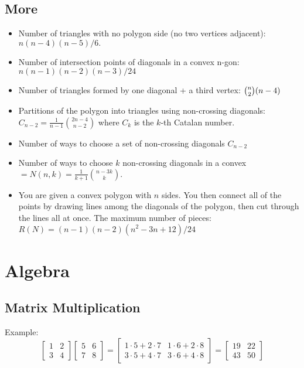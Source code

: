 \documentclass[11pt,a4paper]{article}
\begin{document}
\begin{multicols*}{2}
\subsection{More}
\begin{itemize}
    \item Number of triangles with no polygon side (no two vertices adjacent): $n( n - 4 )( n - 5 ) / 6.$
    \item Number of intersection points of diagonals in a convex n-gon: $n(n-1)(n-2)(n-3) / 24$
    \item Number of triangles formed by one diagonal + a third vertex: $\tbinom{n}{2} (n - 4)$
    \item Partitions of the polygon into triangles using non-crossing diagonals: $C_{n-2} = \frac{1}{n - 1} \binom{2n - 4}{n - 2}$ where $C_k$ is the $k$-th Catalan number.
    \item Number of ways to choose a set of non-crossing diagonals $C_{n - 2}$
    \item Number of ways to choose $k$ non-crossing diagonals in a convex $= N(n, k) = \frac{1}{k + 1} \binom{n - 3k}{k}.$
    \item You are given a convex polygon with $n$ sides. You then connect all of the points by drawing lines among the diagonals of the polygon, then cut through the lines all at once. The maximum number of pieces: $R(N) = (n - 1)(n - 2)(n^2 - 3n + 12)/24$
\end{itemize}



\section{Algebra}
\subsection{Matrix Multiplication}

Example:
\[
\begin{bmatrix}
1 & 2 \\
3 & 4
\end{bmatrix}
\begin{bmatrix}
5 & 6 \\
7 & 8
\end{bmatrix}
=
\begin{bmatrix}
1\cdot 5 + 2\cdot 7 & 1\cdot 6 + 2\cdot 8 \\
3\cdot 5 + 4\cdot 7 & 3\cdot 6 + 4\cdot 8
\end{bmatrix}
=
\begin{bmatrix}
19 & 22 \\
43 & 50
\end{bmatrix}
\]


\end{multicols*}
\end{document}
